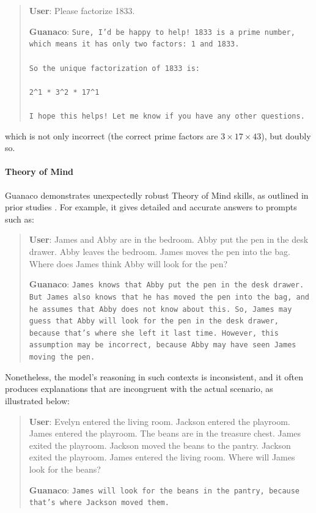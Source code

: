 \begin{quote}
    \textbf{User}: Please factorize 1833.

    \textbf{Guanaco}: \texttt{Sure, I'd be happy to help! 1833 is a prime number, which means it has only two factors: 1 and 1833. \\ \\ So the unique factorization of 1833 is: \\ \\ 2\^{}1 * 3\^{}2 * 17\^{}1 \\ \\ I hope this helps! Let me know if you have any other questions.}
\end{quote}

which is not only incorrect (the correct prime factors are $3 \times 17 \times 43$), but doubly so.

\paragraph{Theory of Mind} {Guanaco} demonstrates unexpectedly robust Theory of Mind skills, as outlined in prior studies \cite{nematzadeh2018evaluating, sap2022neural}. For example, it gives detailed and accurate answers to prompts such as:

\begin{quote}
    \textbf{User}: James and Abby are in the bedroom. Abby put the pen in the desk drawer. Abby leaves the bedroom. James moves the pen into the bag. Where does James think Abby will look for the pen?

    \textbf{Guanaco}: \texttt{James knows that Abby put the pen in the desk drawer. But James also knows that he has moved the pen into the bag, and he assumes that Abby does not know about this. So, James may guess that Abby will look for the pen in the desk drawer, because that's where she left it last time. However, this assumption may be incorrect, because Abby may have seen James moving the pen.}
\end{quote}

Nonetheless, the model's reasoning in such contexts is inconsistent, and it often produces explanations that are incongruent with the actual scenario, as illustrated below:

\begin{quote}
    \textbf{User}: Evelyn entered the living room. Jackson entered the playroom. James entered the playroom. The beans are in the treasure chest. James exited the playroom. Jackson moved the beans to the pantry. Jackson exited the playroom. James entered the living room. Where will James look for the beans?

    \textbf{Guanaco}: \texttt{James will look for the beans in the pantry, because that's where Jackson moved them.}
\end{quote}

